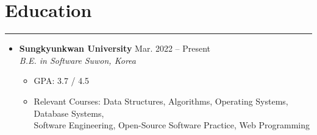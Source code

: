 \documentclass[letterpaper, 10pt]{article}
\begin{document}
\section*{Education}
\hrule
\vspace{4pt}
\begin{itemize}
    \item[]
    \textbf{Sungkyunkwan University} \hfill Mar. 2022 -- Present \\
    \textit{B.E. in Software} \hfill \textit{Suwon, Korea}
    \begin{itemize}
        \item GPA: 3.7 / 4.5
        \item Relevant Courses: Data Structures, Algorithms, Operating Systems, Database Systems, \\
              Software Engineering, Open-Source Software Practice, Web Programming
    \end{itemize}
\end{itemize}

\end{document}
